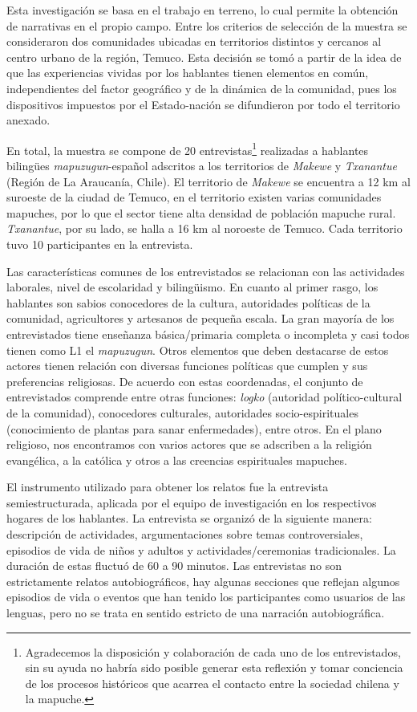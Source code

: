 \documentclass[output=paper]{../langscibook}
\begin{document}
Esta investigación se basa en el trabajo en terreno, lo cual permite la obtención de narrativas en el propio campo. Entre los criterios de selección de la muestra se consideraron dos comunidades ubicadas en territorios distintos y cercanos al centro urbano de la región, Temuco. Esta decisión se tomó a partir de la idea de que las experiencias vividas por los hablantes tienen elementos en común, independientes del factor geográfico y de la dinámica de la comunidad, pues los dispositivos impuestos por el Estado-nación se difundieron por todo el territorio anexado.

En total, la muestra se compone de 20 entrevistas\footnote{Agradecemos la disposición y colaboración de cada uno de los entrevistados, sin su ayuda no habría sido posible generar esta reflexión y tomar conciencia de los procesos históricos que acarrea el contacto entre la sociedad chilena y la mapuche.} realizadas a hablantes bilingües \textit{mapuzugun}{}-español adscritos a los territorios de \textit{Makewe} y \textit{Txanantue} (Región de La Araucanía, Chile). El territorio de \textit{Makewe} se encuentra a 12 km al suroeste de la ciudad de Temuco, en el territorio existen varias comunidades mapuches, por lo que el sector tiene alta densidad de población mapuche rural. \textit{Txanantue}, por su lado, se halla a 16 km al noroeste de Temuco. Cada territorio tuvo 10 participantes en la entrevista. 

Las características comunes de los entrevistados se relacionan con las actividades laborales, nivel de escolaridad y bilingüismo. En cuanto al primer rasgo, los hablantes son sabios conocedores de la cultura, autoridades políticas de la comunidad, agricultores y artesanos de pequeña escala. La gran mayoría de los entrevistados tiene enseñanza básica/primaria completa o incompleta y casi todos tienen como L1 el \textit{mapuzugun}. Otros elementos que deben destacarse de estos actores tienen relación con diversas funciones políticas que cumplen y sus preferencias religiosas. De acuerdo con estas coordenadas, el conjunto de entrevistados comprende entre otras funciones: \textit{logko} (autoridad político-cultural de la comunidad), conocedores culturales, autoridades socio-espirituales (conocimiento de plantas para sanar enfermedades), entre otros. En el plano religioso, nos encontramos con varios actores que se adscriben a la religión evangélica, a la católica y otros a las creencias espirituales mapuches.

El instrumento utilizado para obtener los relatos fue la entrevista semiestructurada, aplicada por el equipo de investigación en los respectivos hogares de los hablantes. La entrevista se organizó de la siguiente manera: descripción de actividades, argumentaciones sobre temas controversiales, episodios de vida de niños y adultos y actividades/ceremonias tradicionales. La duración de estas fluctuó de 60 a 90 minutos. Las entrevistas no son estrictamente relatos autobiográficos, hay algunas secciones que reflejan algunos episodios de vida o eventos \citep{Ochs2006} que han tenido los participantes como usuarios de las lenguas, pero no se trata en sentido estricto de una narración autobiográfica.
\end{document}
